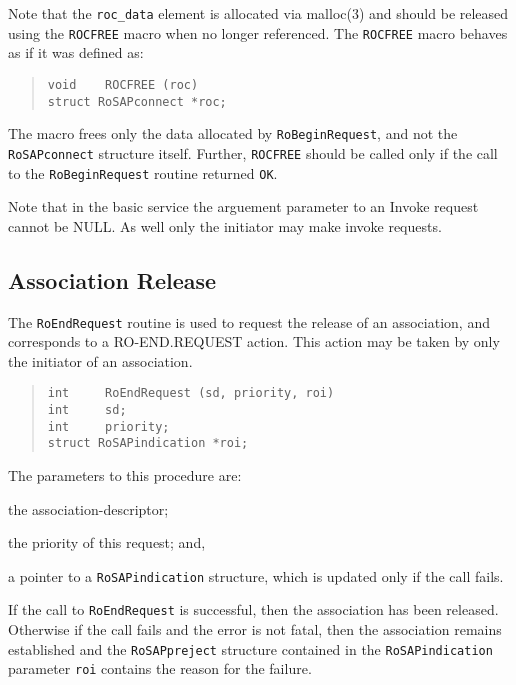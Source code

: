 Note that the \verb"roc_data" element is allocated via \man malloc(3) and
should be released using the \verb"ROCFREE" macro  when no longer referenced.
The \verb"ROCFREE" macro behaves as if it was defined as:
\begin{quote}\small\begin{verbatim}
void    ROCFREE (roc)
struct RoSAPconnect *roc;
\end{verbatim}\end{quote}
The macro frees only the data allocated by \verb"RoBeginRequest",
and not the \verb"RoSAPconnect" structure itself.
Further,
\verb"ROCFREE" should be called only if the call to the \verb"RoBeginRequest"
routine returned \verb"OK".

Note that in the basic service the arguement parameter to an Invoke request
cannot be NULL.
As well only the initiator may make invoke requests.

\subsection       {Association Release}
The \verb"RoEndRequest" routine is used to request the release of an
association,
and corresponds to a {\sf RO-END.REQUEST\/} action.
This action may be taken by only the initiator of an association.
\begin{quote}\small\begin{verbatim}
int     RoEndRequest (sd, priority, roi)
int     sd;
int     priority;
struct RoSAPindication *roi;
\end{verbatim}\end{quote}
The parameters to this procedure are:
\begin{describe}
\item[\verb"sd":] the association-descriptor;

\item[\verb"priority":] the priority of this request;
and,

\item[\verb"roi":] a pointer to a \verb"RoSAPindication" structure, which is
updated only if the call fails.
\end{describe}
If the call to \verb"RoEndRequest" is successful,
then the association has been released.
Otherwise if the call fails and the error is not fatal,
then the association remains established and the \verb"RoSAPpreject" structure
contained in
the \verb"RoSAPindication" parameter \verb"roi" contains the reason for the
failure.

